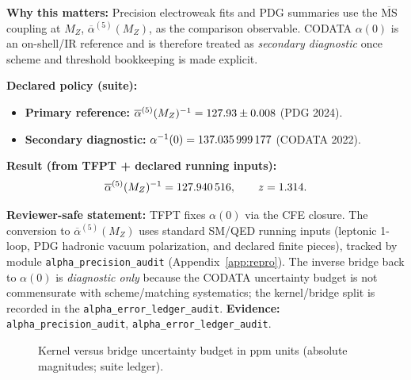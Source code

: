 \begin{tcolorbox}[colback=yellow!3, colframe=yellow!60!black,
    title={\textbf{Primary comparison observable: $\overline{\alpha}^{(5)}(M_Z)$ ($\overline{\mathrm{MS}}$)}}, fonttitle=\bfseries\small]
\textbf{Why this matters:} Precision electroweak fits and PDG summaries use the $\overline{\mathrm{MS}}$ coupling at $M_Z$, $\overline{\alpha}^{(5)}(M_Z)$, as the comparison observable. CODATA $\alpha(0)$ is an on-shell/IR reference and is therefore treated as \emph{secondary diagnostic} once scheme and threshold bookkeeping is made explicit.

\textbf{Declared policy (suite):}
\begin{itemize}[leftmargin=1.5em, topsep=2pt, itemsep=1pt]
    \item \textbf{Primary reference:} $\overline{\alpha}^{(5)}(M_Z)^{-1} = \num{\TFPTalphaBarFiveInvMZRefNum} \pm \num{\TFPTalphaBarFiveInvMZRefSigma}$ (PDG 2024).
    \item \textbf{Secondary diagnostic:} $\alpha^{-1}(0)=\num[round-mode=places,round-precision=9]{\TFPTalphaInvCODATANum}$ (CODATA 2022).
\end{itemize}

\textbf{Result (from TFPT + declared running inputs):}
\[
\overline{\alpha}^{(5)}(M_Z)^{-1}=\num[round-mode=places,round-precision=6]{\TFPTalphaBarFiveInvMZPredNum},
\qquad
z=\num[round-mode=places,round-precision=3]{\TFPTalphaBarFiveInvMZZ}.
\]

\textbf{Reviewer-safe statement:} TFPT fixes $\alpha(0)$ via the CFE closure. The conversion to $\overline{\alpha}^{(5)}(M_Z)$ uses standard SM/QED running inputs (leptonic 1-loop, PDG hadronic vacuum polarization, and declared finite pieces), tracked by module \texttt{alpha\_precision\_audit} (Appendix~\ref{app:repro}). The inverse bridge back to $\alpha(0)$ is \emph{diagnostic only} because the CODATA uncertainty budget is not commensurate with scheme/matching systematics; the kernel/bridge split is recorded in the \texttt{alpha\_error\_ledger\_audit}.
\textbf{Evidence:} \texttt{alpha\_precision\_audit}, \texttt{alpha\_error\_ledger\_audit}.
\end{tcolorbox}

\begin{figure}[H]
\centering
{}
\caption{Kernel versus bridge uncertainty budget in ppm units (absolute magnitudes; suite ledger).}
\label{fig:error-ledger}
\end{figure}

